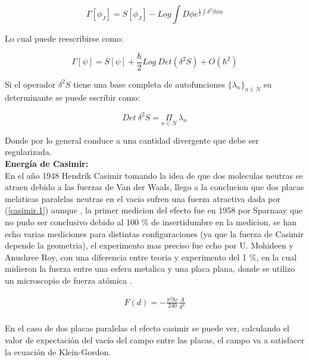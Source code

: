 \begin{equation}
\Gamma [\phi _J ] = S [ \phi _J ] - Log \int D \phi e ^{\frac{1}{2} \int \delta ^2 S \phi \phi }
\end{equation}


Lo cual puede reescribirse como:

\begin{equation}
\Gamma [\psi] = S [\psi] + \frac{\hbar}{2} Log \ Det ( \delta ^2 S ) +
O ( \hbar ^2 )
\end{equation}


Si el operador $ \delta ^2 S $ tiene una base completa de autofunciones $ \{ \lambda _n \} _{n \in N}$ su determinante se puede escribir como:

\begin{equation}
Det \ \delta ^2 S = \underset{ n \in N }{ \Pi } \ \lambda _n
\end{equation}

Donde por lo general conduce a una cantidad divergente que debe ser regularizada.\\



\textbf{Energía de Casimir:} \\ 

En el año 1948 Hendrik Casimir tomando la idea de que dos moleculas neutras se atraen debido a las fuerzas de Van der Waals, llego a la conclucion que dos placas melaticas paralelas neutras en el vacio sufren una fuerza atractiva dada por (\ref{casimir.1}) aunque , la primer medicion del efecto fue en 1958 por Sparnaay que no pudo ser conclusivo debido al 100 \% de insertidumbre en la medicion, se han echo varias mediciones para distintas configuraciones (ya que la fuerza de Casimir depende la geometria), el experimento mas preciso fue echo por U. Mohideen y Anushree Roy, con una diferencia entre teoria y experimento del 1 \%, en la cual midieron la fuerza entre una esfera metalica y una placa plana, donde se utilizo un microscopio de fuerza atómica \cite{BORDAG20011} .


\begin{equation}
\begin{array}{c}
F(d) = - \frac{\pi ^2 \hbar c}{240} \frac{A}{d^4} \\
\end{array} 
\label{casimir.1}
\end{equation}




En el caso de dos placas paralelas el efecto casimir se puede ver, calculando el valor de expectación del vacío del campo entre las placas, el campo va a satisfacer la ecuación de Klein-Gordon.

